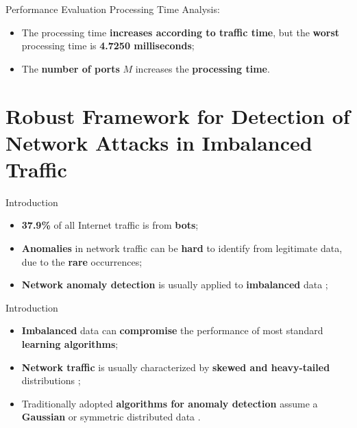 \documentclass[newPxFont, numfooter, sectionpages]{beamer}
\begin{document}
\begin{frame}{Performance Evaluation}
	Processing Time Analysis:
	\begin{itemize}
		\item The processing time \textbf{increases according to traffic time}, but the \textbf{worst} processing time is \textbf{4.7250 milliseconds};
		\item The \textbf{number of ports} $M$ increases the \textbf{processing time}.
	\end{itemize}
\end{frame}


\section{Robust Framework for Detection of Network Attacks in Imbalanced Traffic}

\begin{frame}{Introduction}
	\begin{itemize}
		\item \textbf{37.9\%} of all Internet traffic is from \textbf{bots};
		\item \textbf{Anomalies} in network traffic can be \textbf{hard} to identify from legitimate data, due to the \textbf{rare} occurrences;
		\item \textbf{Network anomaly detection} is usually applied to \textbf{imbalanced} data \cite{Phua2004minority};
	\end{itemize}
\end{frame}

\begin{frame}{Introduction}
	\begin{itemize}
		\item \textbf{Imbalanced} data can \textbf{compromise} the performance of most standard \textbf{learning algorithms};
		\item \textbf{Network traffic} is usually characterized by \textbf{skewed and heavy-tailed} distributions \cite{leon2017probability};
		\item Traditionally adopted \textbf{algorithms for anomaly detection} assume a \textbf{Gaussian} or symmetric distributed data \cite{lakhina2005mining}.
	\end{itemize}
\end{frame}
\end{document}
